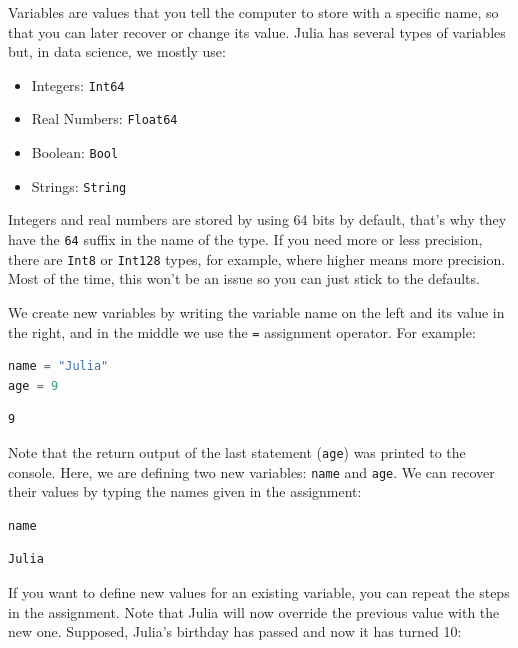 \documentclass[
  notoc %
]{tufte-book}
\providecommand{\tightlist}{%
  \setlength{\itemsep}{0pt}\setlength{\parskip}{0pt}
}
\newcommand{\passthrough}[1]{#1}
\begin{document}
Variables are values that you tell the computer to store with a specific
name, so that you can later recover or change its value. Julia has
several types of variables but, in data science, we mostly use:

\begin{itemize}
\tightlist
\item
  Integers: \passthrough{\lstinline!Int64!}
\item
  Real Numbers: \passthrough{\lstinline!Float64!}
\item
  Boolean: \passthrough{\lstinline!Bool!}
\item
  Strings: \passthrough{\lstinline!String!}
\end{itemize}

Integers and real numbers are stored by using 64 bits by default, that's
why they have the \passthrough{\lstinline!64!} suffix in the name of the
type. If you need more or less precision, there are
\passthrough{\lstinline!Int8!} or \passthrough{\lstinline!Int128!}
types, for example, where higher means more precision. Most of the time,
this won't be an issue so you can just stick to the defaults.

We create new variables by writing the variable name on the left and its
value in the right, and in the middle we use the
\passthrough{\lstinline!=!} assignment operator. For example:

\begin{lstlisting}[language=Julia]
name = "Julia"
age = 9
\end{lstlisting}

\begin{lstlisting}[language=Output]
9
\end{lstlisting}

Note that the return output of the last statement
(\passthrough{\lstinline!age!}) was printed to the console. Here, we are
defining two new variables: \passthrough{\lstinline!name!} and
\passthrough{\lstinline!age!}. We can recover their values by typing the
names given in the assignment:

\begin{lstlisting}[language=Julia]
name
\end{lstlisting}

\begin{lstlisting}[language=Output]
Julia
\end{lstlisting}

If you want to define new values for an existing variable, you can
repeat the steps in the assignment. Note that Julia will now override
the previous value with the new one. Supposed, Julia's birthday has
passed and now it has turned 10:
\end{document}
